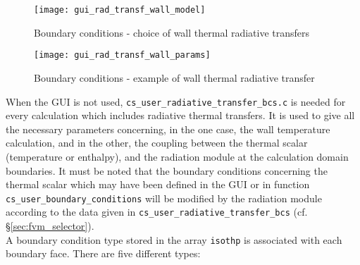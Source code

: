 \begin{figure}[ht]
\begin{center}
\texttt{[image: gui\_rad\_transf\_wall\_model]}
\caption{Boundary conditions - choice of wall thermal radiative transfers}
\label{fig:6_ray}
\end{center}
\end{figure}

\begin{figure}[ht]
\begin{center}
\texttt{[image: gui\_rad\_transf\_wall\_params]}
\caption{Boundary conditions - example of wall thermal radiative transfer}
\label{fig:7_ray}
\end{center}
\end{figure}

When the GUI is not used, \texttt{cs\_user\_radiative\_transfer\_bcs.c} is needed for
every calculation which includes radiative thermal transfers. It is used to give all the
necessary parameters concerning, in the one case, the wall temperature
calculation, and in the other, the coupling between the thermal
scalar (temperature or enthalpy), and the radiation module at the
calculation domain boundaries. It must be noted that the boundary conditions
concerning the thermal scalar which may have been defined in the
GUI or in function \texttt{cs\_user\_boundary\_conditions} will be modified by
the radiation module according to the data given in \texttt{cs\_user\_radiative\_transfer\_bcs} (cf. \S\ref{sec:fvm_selector}).\\
A boundary condition type stored in the array \texttt{isothp} is associated with
each boundary face. There are five different types:

